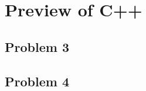 \documentclass{report}
\begin{document}
\chapter{Preview of C++}

\section{Problem 3}

\section{Problem 4}
\end{document}
